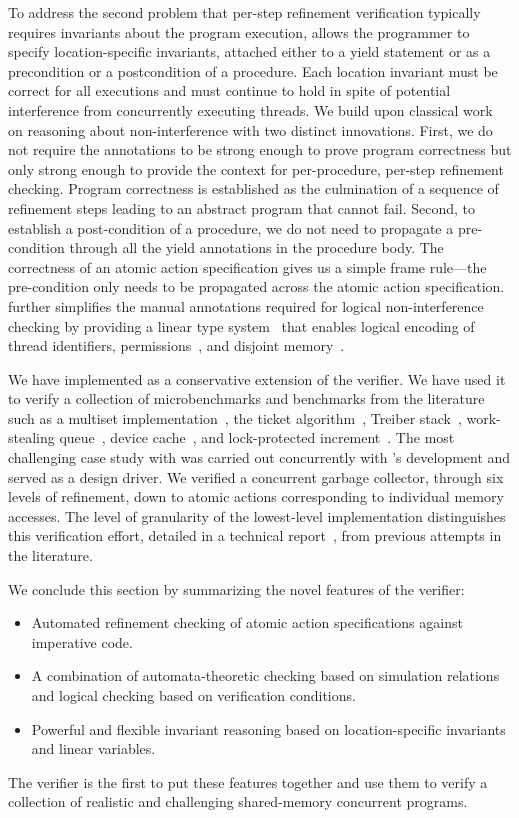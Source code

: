 To address the second problem that per-step refinement verification typically requires invariants about the program execution, 
\civl allows the programmer to specify location-specific invariants, attached either to a yield statement
or as a precondition or a postcondition of a procedure. 
Each location invariant must be correct for all executions and must continue to hold in spite of potential interference from concurrently executing threads.
We build upon classical work~\cite{OwickiG76,Jones83} on reasoning about non-interference
with two distinct innovations.
First, we do not require the annotations to be strong enough to prove program correctness but only strong enough to provide the context for per-procedure, per-step refinement checking. 
Program correctness is established as the culmination of a sequence of refinement steps leading to an abstract program that cannot fail.
Second, to establish a post-condition of a procedure, we do not need to propagate a pre-condition through all the yield annotations in the procedure body. 
The correctness of an atomic action specification gives us a simple frame rule---the pre-condition only needs to be propagated across the atomic action specification. 
\civl further simplifies the manual annotations required for logical non-interference checking
by providing a linear type system~\cite{Wadler90lineartypes} that enables logical encoding of thread identifiers, permissions~\cite{boyland:03fractions}, 
and disjoint memory~\cite{LahiriQW11}.

We have implemented \civl as a conservative extension of the \boogie verifier.  
We have used it to verify a collection of microbenchmarks and benchmarks from the literature such as 
a multiset implementation~\cite{ElmasTQ05},
the ticket algorithm~\cite{FarzanKP14}, 
Treiber stack~\cite{Herlihy2008}, work-stealing queue~\cite{Blumofe1999},
device cache~\cite{ElmasQT09}, and lock-protected increment~\cite{FlanaganQ03}. 
The most challenging case study with \civl was carried out concurrently with \civl's development and served as a design driver. 
We verified a concurrent garbage collector, through six levels of refinement, down to atomic actions corresponding to individual memory accesses. 
The level of granularity of the lowest-level implementation distinguishes this verification effort, 
detailed in a technical report~\cite{gc-techreport}, from previous attempts in the literature. 

We conclude this section by summarizing the novel features of the \civl verifier:
\begin{itemize}
\item Automated refinement checking of atomic action specifications against imperative code.
\item A combination of automata-theoretic checking based on simulation relations and logical checking based on verification conditions.
\item Powerful and flexible invariant reasoning based on location-specific invariants and linear variables.
\end{itemize}
The \civl verifier is the first to put these features together and use them to verify a collection of realistic and challenging shared-memory
concurrent programs.
